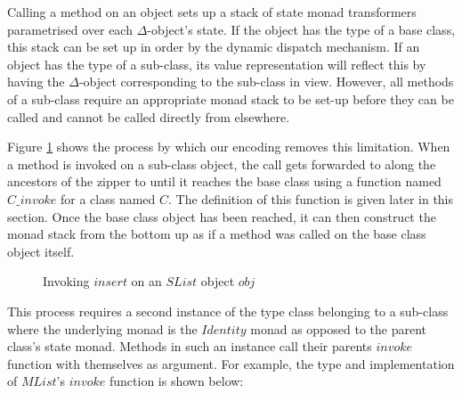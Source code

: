 \documentclass[runningheads,a4paper]{llncs}
\begin{document}
Calling a method on an object sets up a stack of state monad transformers parametrised over each $\Delta$-object's state. If the object has the type of a base class, this stack can be set up in order by the dynamic dispatch mechanism. If an object has the type of a sub-class, its value representation will reflect this by having the $\Delta$-object corresponding to the sub-class in view. However, all methods of a sub-class require an appropriate monad stack to be set-up before they can be called and cannot be called directly from elsewhere.

Figure \ref{fig:subinvoke} shows the process by which our encoding removes this limitation. When a method is invoked on a sub-class object, the call gets forwarded to along the ancestors of the zipper to until it reaches the base class using a function named $C\_\mathit{invoke}$ for a class named $C$. The definition of this function is given later in this section. Once the base class object has been reached, it can then construct the monad stack from the bottom up as if a method was called on the base class object itself.

\begin{figure}
\begin{center}
\end{center}
\caption{Invoking $\mathit{insert}$ on an $\mathit{SList}$ object $\mathit{obj}$} \label{fig:subinvoke}
\end{figure}

This process requires a second instance of the type class belonging to a sub-class where the underlying monad is the $\mathit{Identity}$ monad as opposed to the parent class's state monad. Methods in such an instance call their parents $\mathit{invoke}$ function with themselves as argument. For example, the type and implementation of $\mathit{MList}$'s $\mathit{invoke}$ function is shown below:
\end{document}
